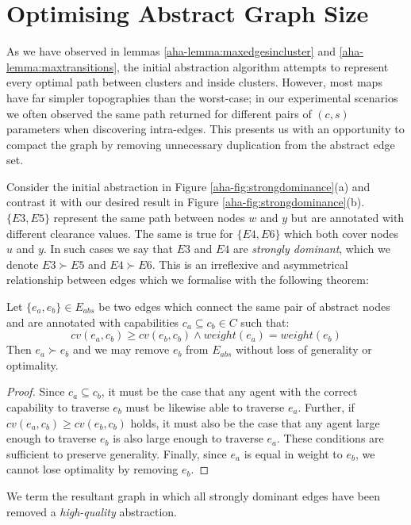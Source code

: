 \section{Optimising Abstract Graph Size}
\par \indent
As we have observed in lemmas \ref{aha-lemma:maxedgesincluster} and \ref{aha-lemma:maxtransitions}, the initial abstraction algorithm attempts to represent every optimal path between clusters and inside clusters.
However, most maps have far simpler topographies than the worst-case; in our  experimental scenarios we often observed the same path returned for different pairs of $(c, s)$ parameters when discovering intra-edges.
This presents us with an opportunity to compact the graph by removing unnecessary duplication from the abstract edge set. 
\par \indent
Consider the initial abstraction in Figure \ref{aha-fig:strongdominance}(a) and contrast it with our desired result in Figure \ref{aha-fig:strongdominance}(b). 
$\lbrace E3, E5 \rbrace$ represent the same path between nodes $w$ and $y$ but are annotated with different clearance values. 
The same is true  for $\lbrace E4, E6 \rbrace$ which both cover nodes $u$ and $y$. 
In such cases we say that $E3$ and $E4$ are \emph{strongly dominant}, which we denote $E3 \succ E5$ and $E4 \succ E6$. 
This is an irreflexive and asymmetrical relationship between edges which we formalise with the following theorem: 
\begin{theorem}
\label{aha-theorem:strongdominance}
Let $\lbrace e_{a}, e_{b} \rbrace \in E_{abs}$ be two edges which connect the same pair of abstract nodes and are annotated with capabilities $c_{a} \subseteq c_{b} \in C$ such that: 
$$ cv(e_{a}, c_{b}) \geq cv(e_{b}, c_{b}) \wedge weight(e_{a}) = weight(e_{b})$$
Then $e_{a} \succ e_{b}$ and we may remove $e_{b}$ from $E_{abs}$ without loss of generality or optimality.
\end{theorem}
\begin{proof}
Since $c_{a} \subseteq c_{b}$, it must be the case that any agent with the correct capability to traverse $e_{b}$ must be likewise able to traverse $e_{a}$.
Further, if $cv(e_{a}, c_{b}) \geq cv(e_{b}, c_{b})$ holds, it must also be the case that any agent large enough to traverse $e_{b}$ is also large enough to traverse $e_{a}$.
These conditions are sufficient to preserve generality.
Finally, since $e_{a}$ is equal in weight to $e_{b}$, we cannot lose optimality by removing $e_{b}$.
\end{proof}
We term the resultant graph in which all strongly dominant edges have been removed a \emph{high-quality} abstraction.  

